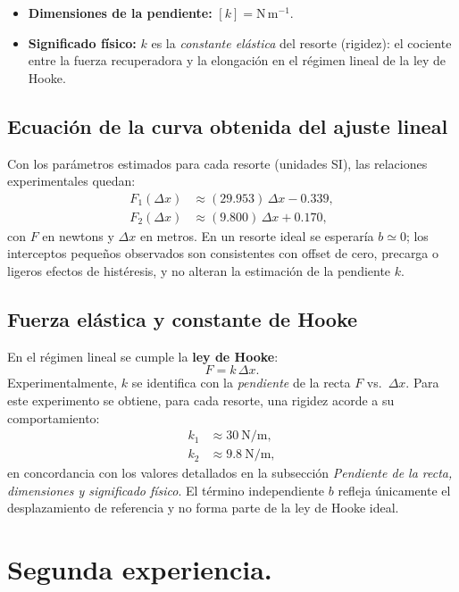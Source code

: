 \documentclass[11pt,twocolumn]{article}
\begin{document}
\begin{itemize}
\item \textbf{Dimensiones de la pendiente:} $[k] = \mathrm{N\,m^{-1}}$. 
\item \textbf{Significado físico:} $k$ es la \emph{constante elástica} del resorte (rigidez): el cociente entre la fuerza recuperadora y la elongación en el régimen lineal de la ley de Hooke.
\end{itemize}

\subsection{Ecuación de la curva obtenida del ajuste lineal}
Con los parámetros estimados para cada resorte (unidades SI), las relaciones experimentales quedan:
\begin{align*}
    F_1(\Delta x)&\approx (29.953)\,\Delta x - 0.339,\\[6pt]
    F_2(\Delta x)&\approx (9.800)\,\Delta x + 0.170,
\end{align*}
con $F$ en newtons y $\Delta x$ en metros. En un resorte ideal se esperaría $b\simeq 0$; los interceptos pequeños observados son consistentes con offset de cero, precarga o ligeros efectos de histéresis, y no alteran la estimación de la pendiente $k$.

\subsection{Fuerza elástica y constante de Hooke}
En el régimen lineal se cumple la \textbf{ley de Hooke}:
\begin{equation*}
    F = k\,\Delta x.
\end{equation*}
Experimentalmente, $k$ se identifica con la \emph{pendiente} de la recta $F$ vs.\ $\Delta x$. Para este experimento se obtiene, para cada resorte, una rigidez acorde a su comportamiento:
\begin{align*}
    k_1 &\approx 30~\mathrm{N/m}, \\[6pt]
    k_2 &\approx 9.8~\mathrm{N/m},
\end{align*}
en concordancia con los valores detallados en la subsección \emph{Pendiente de la recta, dimensiones y significado físico}. El término independiente $b$ refleja únicamente el desplazamiento de referencia y no forma parte de la ley de Hooke ideal.

\section{Segunda experiencia.}
\label{sec:segunda_experiencia}
\end{document}
